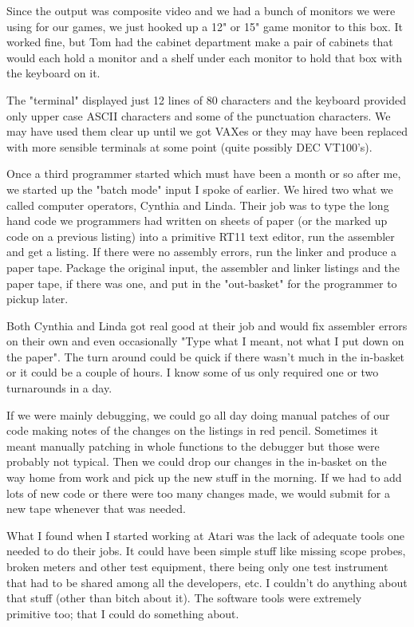 Since the output was composite video and we had a bunch of monitors we were using for our games, we just hooked up a 12" or 15" game monitor to this box. It worked fine, but Tom had the cabinet department make a pair of cabinets that would each hold a monitor and a shelf under each monitor to hold that box with the keyboard on it. 

The "terminal" displayed just 12 lines of 80 characters and the keyboard provided only upper case ASCII characters and some of the punctuation characters. We may have used them clear up until we got VAXes or they may have been replaced with more sensible terminals at some point (quite possibly DEC VT100's).

Once a third programmer started which must have been a month or so after me, we started up the "batch mode" input I spoke of earlier. We hired two what we called computer operators, Cynthia and Linda. Their job was to type the long hand code we programmers had written on sheets of paper (or the marked up code on a previous listing) into a primitive RT11 text editor, run the assembler and get a listing. If there were no assembly errors, run the linker and produce a paper tape. Package the original input, the assembler and linker listings and the paper tape, if there was one, and put in the "out-basket" for the programmer to pickup later. 

Both Cynthia and Linda got real good at their job and would fix assembler errors on their own and even occasionally "Type what I meant, not what I put down on the paper". The turn around could be quick if there wasn't much in the in-basket or it could be a couple of hours. I know some of us only required one or two turnarounds in a day. 

If we were mainly debugging, we could go all day doing manual patches of our code making notes of the changes on the listings in red pencil. Sometimes it meant manually patching in whole functions to the debugger but those were probably not typical. Then we could drop our changes in the in-basket on the way home from work and pick up the new stuff in the morning. If we had to add lots of new code or there were too many changes made, we would submit for a new tape whenever that was needed.

What I found when I started working at Atari was the lack of adequate tools one needed to do their jobs. It could have been simple stuff like missing scope probes, broken meters and other test equipment, there being only one test instrument that had to be shared among all the developers, etc. I couldn't do anything about that stuff (other than bitch about it). The software tools were extremely primitive too; that I could do something about. 

